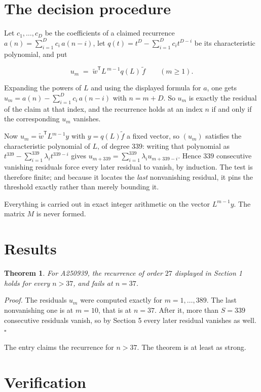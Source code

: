 \documentclass[11pt]{article}
\newtheorem{theorem}{Theorem}
\theoremstyle{definition}
\begin{document}
\section{The decision procedure}

Let $c_1,\dots,c_D$ be the coefficients of a claimed recurrence $a(n) = \sum_{i=1}^{D} c_i\,a(n-i)$, let $q(t) = t^{D} - \sum_{i=1}^{D} c_i t^{D-i}$ be its characteristic polynomial, and put

\[u_m \;=\; \tilde w^{\mathsf T} L^{\,m-1} q(L)\,\tilde f \qquad (m \ge 1).\]

Expanding the powers of $L$ and using the displayed formula for $a$, one gets $u_m = a(n) - \sum_{i=1}^{D} c_i\,a(n-i)$ with $n = m + D$. So $u_m$ is exactly the residual of the claim at that index, and the recurrence holds at an index $n$ if and only if the corresponding $u_m$ vanishes.

Now $u_m = \tilde w^{\mathsf T} L^{m-1} y$ with $y = q(L)\tilde f$ a fixed vector, so $(u_m)$ satisfies the characteristic polynomial of $L$, of degree $339$: writing that polynomial as $t^{339} - \sum_{i=1}^{339} \lambda_i t^{339-i}$ gives $u_{m+339} = \sum_{i=1}^{339} \lambda_i u_{m+339-i}$. Hence $339$ consecutive vanishing residuals force every later residual to vanish, by induction. The test is therefore finite; and because it locates the {\itshape last} nonvanishing residual, it pins the threshold exactly rather than merely bounding it.

Everything is carried out in exact integer arithmetic on the vector $L^{m-1}y$. The matrix $M$ is never formed.

\section{Results}

\begin{theorem} For A250939, the recurrence of order $27$ displayed in Section 1 holds for every $n > 37$, and fails at $n = 37$.\end{theorem}

{\itshape Proof.} The residuals $u_m$ were computed exactly for $m = 1,\dots,389$. The last nonvanishing one is at $m = 10$, that is at $n = 37$. After it, more than $S = 339$ consecutive residuals vanish, so by Section 5 every later residual vanishes as well. $\square$

The entry claims the recurrence for $n > 37$. The theorem is at least as strong.

\section{Verification}
\end{document}
